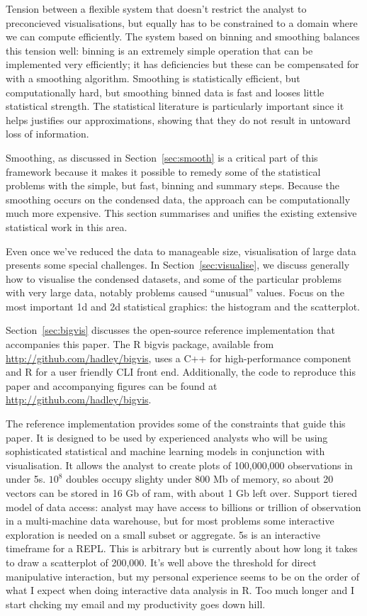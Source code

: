 \documentclass[journal]{vgtc}                %
\begin{document}
Tension between a flexible system that doesn't restrict the analyst to preconcieved visualisations, but equally has to be constrained to a domain where we can compute efficiently. The system based on binning and smoothing balances this tension well: binning is an extremely simple operation that can be implemented very efficiently; it has deficiencies but these can be compensated for with a smoothing algorithm. Smoothing is statistically efficient, but computationally hard, but smoothing binned data is fast and looses little statistical strength. The statistical literature is particularly important since it helps justifies our approximations, showing that they do not result in untoward loss of information.

Smoothing, as discussed in Section~\ref{sec:smooth} is a critical part of this framework because it makes it possible to remedy some of the statistical problems with the simple, but fast, binning and summary steps. Because the smoothing occurs on the condensed data, the approach can be computationally much more expensive. This section summarises and unifies the existing extensive statistical work in this area.

Even once we've reduced the data to manageable size, visualisation of large data presents some special challenges. In Section~\ref{sec:visualise}, we discuss generally how to visualise the condensed datasets, and some of the particular problems with very large data, notably problems caused ``unusual'' values.  Focus on the most important 1d and 2d statistical graphics: the histogram and the scatterplot.

Section~\ref{sec:bigvis} discusses the open-source reference implementation that accompanies this paper. The R \citep{R} bigvis package, available from \url{http://github.com/hadley/bigvis}, uses a C++ for high-performance component and R for a user friendly CLI front end.  Additionally, the code to reproduce this paper and accompanying figures can be found at \url{http://github.com/hadley/bigvis}.

The reference implementation provides some of the constraints that guide this paper. It is designed to be used by experienced analysts who will be using  sophisticated statistical and machine learning models in conjunction with visualisation.  It allows the analyst to create plots of 100,000,000 observations in under 5s. $10^8$ doubles occupy slighty under 800 Mb of memory, so about 20 vectors can be stored in 16 Gb of ram, with about 1 Gb left over. Support tiered model of data access: analyst may have access to billions or trillion of observation in a multi-machine data warehouse, but for most problems some interactive exploration is needed on a small subset or aggregate. 5s is an interactive timeframe for a REPL.  This is arbitrary but is currently about how long it takes to draw a scatterplot of 200,000. It's well above the threshold for direct manipulative interaction, but my personal experience seems to be on the order of what I expect when doing interactive data analysis in R.  Too much longer and I start chcking my email and my productivity goes down hill.
\end{document}
